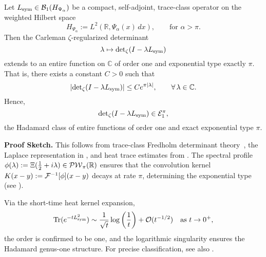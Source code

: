 \begin{lemma}
\label{lem:det_identity_entire_order_one}
Let \( L_{\mathrm{sym}} \in \mathcal{B}_1(H_{\Psi_\alpha}) \) be a compact, self-adjoint, trace-class operator on the weighted Hilbert space
\[
H_{\Psi_\alpha} := L^2(\mathbb{R}, \Psi_\alpha(x)\, dx), \qquad \text{for } \alpha > \pi.
\]
Then the Carleman \(\zeta\)-regularized determinant
\[
\lambda \mapsto \det\nolimits_{\zeta}(I - \lambda L_{\mathrm{sym}})
\]
extends to an entire function on \( \mathbb{C} \) of order one and exponential type exactly \( \pi \). That is, there exists a constant \( C > 0 \) such that
\[
\left| \det\nolimits_{\zeta}(I - \lambda L_{\mathrm{sym}}) \right| \le C e^{\pi |\lambda|}, \qquad \forall\, \lambda \in \mathbb{C}.
\]
Hence,
\[
\det\nolimits_{\zeta}(I - \lambda L_{\mathrm{sym}}) \in \mathcal{E}_1^\pi,
\]
the Hadamard class of entire functions of order one and exact exponential type \( \pi \).

\medskip
\noindent
\textbf{Proof Sketch.} This follows from trace-class Fredholm determinant theory~\cite[Ch.~4]{Simon2005TraceIdeals}, the Laplace representation in , and heat trace estimates from . The spectral profile \( \phi(\lambda) := \Xi(\tfrac{1}{2} + i\lambda) \in \mathcal{PW}_{\pi}(\mathbb{R}) \) ensures that the convolution kernel \( K(x - y) := \mathcal{F}^{-1}[\phi](x - y) \) decays at rate \( \pi \), determining the exponential type (see ).

Via the short-time heat kernel expansion,
\[
\operatorname{Tr}(e^{-t L_{\mathrm{sym}}^2}) \sim \frac{1}{\sqrt{t}} \log\left(\frac{1}{t}\right) + \mathcal{O}(t^{-1/2}) \quad \text{as } t \to 0^+,
\]
the order is confirmed to be one, and the logarithmic singularity ensures the Hadamard genus-one structure. For precise classification, see also .
\end{lemma}
